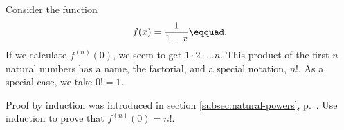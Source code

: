 Consider the function 
\begin{equation*}
  f(x) = \frac{1}{1-x}\eqquad.
\end{equation*}
If we calculate $f^{(n)}(0)$, we seem to get
$1\cdot2\cdot\ldots n$. This product of the first $n$ natural numbers
has a name, the factorial, and a special notation, $n!$. As a special
case, we take $0!=1$.

Proof by induction was introduced in section \ref{subsec:natural-powers}, p.~\pageref{induction}.
Use induction to prove that $f^{(n)}(0)=n!$.
